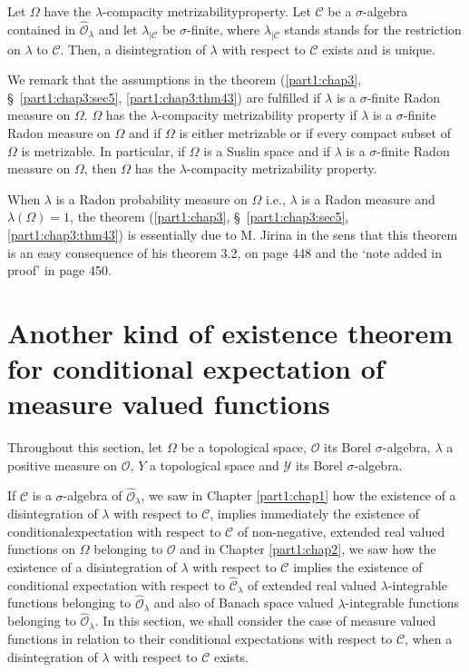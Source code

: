\begin{thm}[Existence]\label{part1:chap3:thm44}
Let $\Omega$ have the $\lambda$-compacity metrizability\break property. Let
$\mathscr{C}$ be a $\sigma$-algebra contained in
$\hat{\mathscr{O}}_\lambda$ and let $\lambda_{|\mathscr{C}}$ be
$\sigma$-finite, where $\lambda_{|\mathscr{C}}$ stands stands for the
restriction on $\lambda$ to $\mathscr{C}$. Then, a disintegration of
$\lambda$ with respect to $\mathscr{C}$ exists and is unique. 
\end{thm}

We remark that the assumptions in the theorem (\ref{part1:chap3},
\S\ \ref{part1:chap3:sec5},  \ref{part1:chap3:thm43}) are
fulfilled if $\lambda$ is a $\sigma$-finite Radon measure on
$\Omega$. $\Omega$ has the $\lambda$-compacity metrizability property
if $\lambda$ is a $\sigma$-finite Radon measure on $\Omega$ and if
$\Omega$ is either metrizable or if every compact subset of $\Omega$
is metrizable. In particular, if $\Omega$ is a Suslin space and if
$\lambda$ is a $\sigma$-finite Radon measure on $\Omega$, then
$\Omega$ has the $\lambda$-compacity metrizability property. 

When $\lambda$ is a Radon probability measure on $\Omega$ i.e.,
$\lambda$ is a Radon measure and $\lambda(\Omega) =1$, the theorem
(\ref{part1:chap3}, \S\ \ref{part1:chap3:sec5},
\ref{part1:chap3:thm43}) is essentially due to M. Jirina \cite{key1}
in the sens that this theorem is an easy consequence of his theorem 3.2, on
page 448 and the `note added in proof' in page 450.

\section[Another kind of existence theorem...]{Another kind of
  existence theorem for conditional expectation 
of measure valued functions}\label{part1:chap3:sec6}

Throughout this section, let $\Omega$ be a topological space,
$\mathscr{O}$ its Borel $\sigma$-algebra, $\lambda$ a positive measure
on $\mathscr{O}$, $Y$ a topological space and $\mathscr{Y}$ its Borel
$\sigma$-algebra. 

If $\mathscr{C}$ is a $\sigma$-algebra of $\hat{\mathscr{O}}_\lambda$,
we saw in Chapter \ref{part1:chap1} how the existence of a disintegration of $\lambda$
with respect to $\mathscr{C}$, implies immediately the existence of
conditional\pageoriginale expectation with respect to $\mathscr{C}$ of
non-negative, extended real valued functions on $\Omega$ belonging
to $\mathscr{O}$ and in Chapter \ref{part1:chap2}, we saw how the existence of a
disintegration of $\lambda$ with respect to  $\mathscr{C}$ implies the
existence of conditional expectation with respect to
$\hat{\mathscr{C}}_\lambda$ of extended real valued
$\lambda$-integrable functions belonging to
$\hat{\mathscr{O}}_\lambda$ and also of Banach space valued
$\lambda$-integrable functions belonging to
$\hat{\mathscr{O}}_\lambda$. In this section, we shall consider the
case of measure valued functions in relation to their conditional
expectations with respect to $\mathscr{C}$, when a disintegration of
$\lambda$ with respect to $\mathscr{C}$ exists. 

